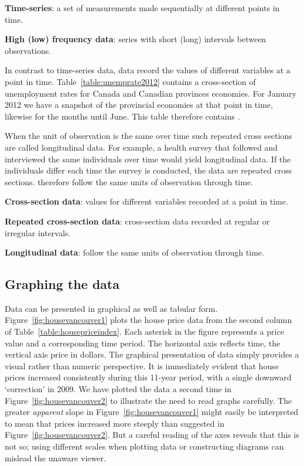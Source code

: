 \newhtmlpage

\begin{DefBox}
\textbf{Time-series}: a set of measurements made sequentially at different points in time.

\textbf{High (low) frequency data}: series with short (long) intervals between observations.
\end{DefBox}

In contrast to time-series data,  data record the
values of different variables at a point in time. Table~\ref{table:unemprate2012}
contains a cross-section of unemployment rates for
Canada and Canadian provinces economies. For January 2012 we have a snapshot
of the provincial economies at that point in time, likewise for the months
until June. This table therefore contains .

When the unit of observation is the same over time such repeated cross
sections are called longitudinal data. For example, a health survey that
followed and interviewed the same individuals over time would yield
longitudinal data. If the individuals differ each time the survey is
conducted, the data are repeated cross sections. 
 therefore follow the same units of observation through time.

\begin{DefBox}
\textbf{Cross-section data}: values for different variables recorded at a point in time.

\textbf{Repeated cross-section data}: cross-section data recorded at regular or irregular intervals.

\textbf{Longitudinal data}: follow the same units of observation through time.
\end{DefBox}

\newhtmlpage

\subsection*{Graphing the data}

Data can be presented in graphical as well as tabular form. Figure~\ref{fig:housevancouver1}
plots the house price data from the second column of Table~\ref{table:housepriceindex}. Each
asterisk in the figure represents a price value and a corresponding time
period. The horizontal axis reflects time, the vertical axis price in
dollars. The graphical presentation of data simply provides a visual rather
than numeric perspective. It is immediately evident that house prices
increased consistently during this 11-year period, with a single downward
`correction' in 2009. We have plotted the data a second time in Figure~\ref{fig:housevancouver2} to
illustrate the need to read graphs carefully. The greater \textit{apparent}
slope in Figure~\ref{fig:housevancouver1} might easily be interpreted to
mean that prices increased more steeply than suggested in Figure~\ref{fig:housevancouver2}.
But a careful reading of the axes reveals that this
is not so; using different scales when plotting data or constructing
diagrams can mislead the unaware viewer.

